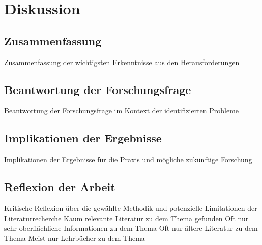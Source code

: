\section{Diskussion}
\subsection{Zusammenfassung}
Zusammenfassung der wichtigsten Erkenntnisse aus den Herausforderungen
\subsection{Beantwortung der Forschungsfrage}
Beantwortung der Forschungsfrage im Kontext der identifizierten Probleme
\subsection{Implikationen der Ergebnisse}
Implikationen der Ergebnisse für die Praxis und mögliche zukünftige Forschung
\subsection{Reflexion der Arbeit}
Kritische Reflexion über die gewählte Methodik und potenzielle Limitationen der Literaturrecherche
Kaum relevante Literatur zu dem Thema gefunden
Oft nur sehr oberflächliche Informationen zu dem Thema
Oft nur ältere Literatur zu dem Thema
Meist nur Lehrbücher zu dem Thema